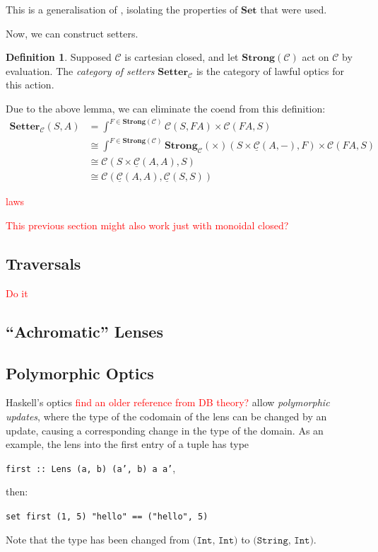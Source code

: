 \documentclass[11pt,a4paper]{article}
\theoremstyle{plain}
\theoremstyle{definition}
\newtheorem{definition}[theorem]{Definition}
\newcommand{\C}{\mathscr{C}}
\newcommand{\homC}{\underline{\C}}
\newcommand{\Set}{\mathbf{Set}}
\newcommand{\Setter}{\mathbf{Setter}}
\newcommand{\Strong}{\mathbf{Strong}}
\newcommand{\todo}[1]{\textcolor{red}{\small #1}}
\begin{document}
This is a generalisation of \cite[Proposition 2.2]{SecondOrderFunctionals}, isolating the properties of $\Set$ that were used.

Now, we can construct setters. 

\begin{definition}
Supposed $\C$ is cartesian closed, and let $\Strong(\C)$ act on $\C$ by evaluation. The \emph{category of setters} $\Setter_\C$ is the category of lawful optics for this action.
\end{definition}

Due to the above lemma, we can eliminate the coend from this definition:
\begin{align*}
\Setter_\C(S, A) &= \int^{F \in \Strong(\C)} \C(S, FA) \times \C(FA, S) \\
&\cong \int^{F \in \Strong(\C)} \Strong_\C(\times)(S \times \homC(A, -), F)  \times \C(FA, S) \\
&\cong \C(S \times \homC(A, A), S) \\
&\cong \C(\homC(A, A), \homC(S,S))
\end{align*}

\todo{laws}

\todo{This previous section might also work just with monoidal closed?}

\subsection{Traversals}
\todo{Do it}

\subsection{``Achromatic'' Lenses}

\subsection{Polymorphic Optics}
Haskell's optics \todo{find an older reference from DB theory?} allow \emph{polymorphic updates}, where the type of the codomain of the lens can be changed by an update, causing a corresponding change in the type of the domain. As an example, the lens into the first entry of a tuple has type
\begin{center}
\texttt{first :: Lens (a, b) (a', b) a a'}, 
\end{center}
then:
\begin{center}
\texttt{set first (1, 5) "hello" == ("hello", 5)}
\end{center}
Note that the type has been changed from $\texttt{(Int, Int)}$ to $\texttt{(String, Int)}$.
\end{document}
